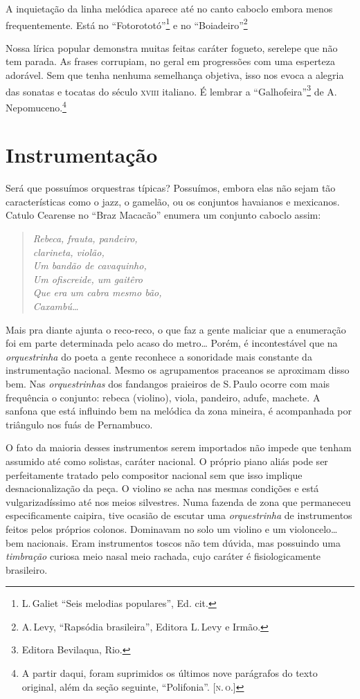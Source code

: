 A inquietação da linha melódica aparece até no canto caboclo embora
menos frequentemente. Está no ``Fotorototó''\footnote{L.\,Galiet ``Seis melodias
populares'', Ed. cit.} e no ``Boiadeiro''\footnote{A.\,Levy, ``Rapsódia brasileira'',
Editora L.\,Levy e Irmão.}

Nossa lírica popular demonstra muitas feitas caráter fogueto, serelepe
que não tem parada. As frases corrupiam, no geral em progressões com uma
esperteza adorável. Sem que tenha nenhuma semelhança objetiva, isso nos
evoca a alegria das sonatas e tocatas do século \textsc{xviii} italiano. É lembrar
a ``Galhofeira''\footnote{Editora Bevilaqua, Rio.} de A.\,Nepomuceno.\footnote{A partir daqui, foram suprimidos os últimos nove parágrafos do texto original, além da seção seguinte, ``Polifonia''. \textsc{{[}n.\,o.{]}}}

\section{Instrumentação}

Será que possuímos orquestras típicas? Possuímos, embora elas não sejam
tão características como o jazz, o gamelão, ou os conjuntos havaianos e
mexicanos. Catulo Cearense no ``Braz Macacão'' enumera um conjunto caboclo
assim:

\begin{verse}
\small{
\textit{Rebeca, frauta, pandeiro,}\\
\textit{clarineta, violão,}\\
\textit{Um bandão de cavaquinho,}\\
\textit{Um ofiscreide, um gaitêro}\\
\textit{Que era um cabra mesmo bão,}\\
\textit{Caxambú\ldots{}}}
\end{verse}

Mais pra diante ajunta o reco-reco, o que faz a gente maliciar que a
enumeração foi em parte determinada pelo acaso do metro\ldots{} Porém, é
incontestável que na \textit{orquestrinha} do poeta a gente reconhece a
sonoridade mais constante da instrumentação nacional. Mesmo os
agrupamentos praceanos se aproximam disso bem. Nas \textit{orquestrinhas} dos
fandangos praieiros de S.\,Paulo ocorre com mais frequência o conjunto:
rebeca (violino), viola, pandeiro, adufe, machete. A sanfona que está
influindo bem na melódica da zona mineira, é acompanhada por triângulo
nos fuás de Pernambuco.

O fato da maioria desses instrumentos serem importados não impede que
tenham assumido até como solistas, caráter nacional. O próprio piano
aliás pode ser perfeitamente tratado pelo compositor nacional sem que
isso implique desnacionalização da peça. O violino se acha nas mesmas
condições e está vulgarizadíssimo até nos meios silvestres. Numa fazenda
de zona que permaneceu especificamente caipira, tive ocasião de escutar
uma \textit{orquestrinha} de instrumentos feitos pelos próprios colonos.
Dominavam no solo um violino e um violoncelo\ldots{} bem nacionais. Eram
instrumentos toscos não tem dúvida, mas possuindo uma \textit{timbração} curiosa
meio nasal meio rachada, cujo caráter é fisiologicamente brasileiro.

